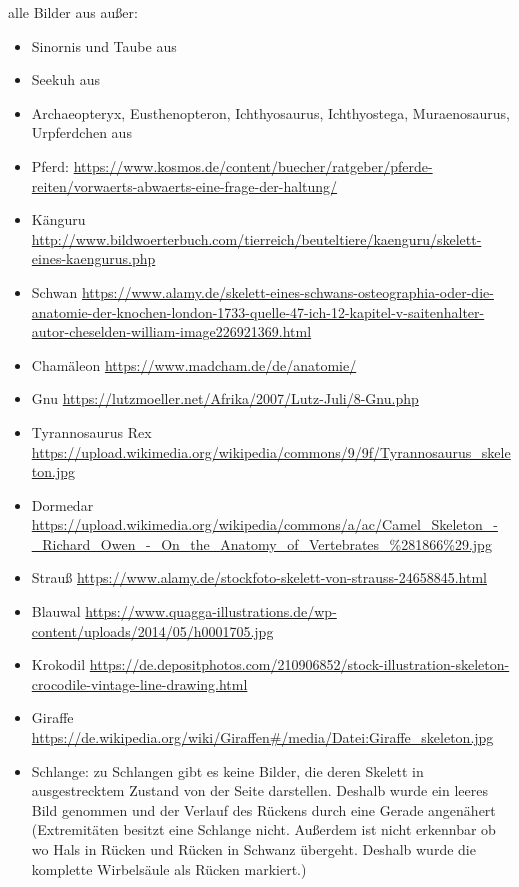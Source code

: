  alle Bilder aus \cite{Spezielle_Zoologie} außer:
 \begin{itemize}
  \item Sinornis und Taube aus \cite{Vergleichende_Anatomie}
  \item Seekuh aus \cite{Zoologie25Wehner}
  \item Archaeopteryx, Eusthenopteron, Ichthyosaurus, Ichthyostega, Muraenosaurus, Urpferdchen aus \cite{Zoologie24Wehner}
  \item Pferd: \url{https://www.kosmos.de/content/buecher/ratgeber/pferde-reiten/vorwaerts-abwaerts-eine-frage-der-haltung/}
  \item Känguru \url{http://www.bildwoerterbuch.com/tierreich/beuteltiere/kaenguru/skelett-eines-kaengurus.php}
  \item Schwan \url{https://www.alamy.de/skelett-eines-schwans-osteographia-oder-die-anatomie-der-knochen-london-1733-quelle-47-ich-12-kapitel-v-saitenhalter-autor-cheselden-william-image226921369.html}
  \item Chamäleon \url{https://www.madcham.de/de/anatomie/}
  \item Gnu \url{https://lutzmoeller.net/Afrika/2007/Lutz-Juli/8-Gnu.php}
  \item Tyrannosaurus Rex \url{https://upload.wikimedia.org/wikipedia/commons/9/9f/Tyrannosaurus_skeleton.jpg}
  \item Dormedar \url{https://upload.wikimedia.org/wikipedia/commons/a/ac/Camel_Skeleton_-_Richard_Owen_-_On_the_Anatomy_of_Vertebrates_\%281866\%29.jpg}
  \item Strauß \url{https://www.alamy.de/stockfoto-skelett-von-strauss-24658845.html}
  \item Blauwal \url{https://www.quagga-illustrations.de/wp-content/uploads/2014/05/h0001705.jpg}
  \item Krokodil \url{https://de.depositphotos.com/210906852/stock-illustration-skeleton-crocodile-vintage-line-drawing.html}
  \item Giraffe \url{https://de.wikipedia.org/wiki/Giraffen#/media/Datei:Giraffe_skeleton.jpg}
  \item Schlange: zu Schlangen gibt es keine Bilder, die deren Skelett in ausgestrecktem Zustand von der Seite darstellen. Deshalb wurde ein leeres Bild genommen und der Verlauf des Rückens durch eine Gerade angenähert (Extremitäten besitzt eine Schlange nicht. Außerdem ist nicht erkennbar ob \bzw wo Hals in Rücken und Rücken in Schwanz übergeht. Deshalb wurde die komplette Wirbelsäule als Rücken markiert.)
 \end{itemize}

